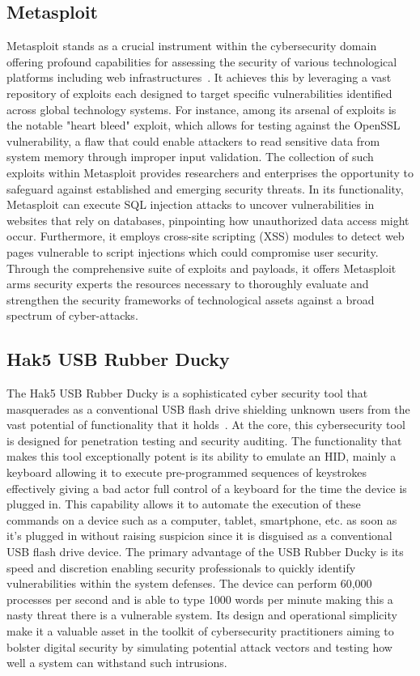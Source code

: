 \documentclass[manuscript,acmsmall,anonymous,review,screen,nonacm=true, authorversion=true]{acmart}
\begin{document}
\subsection{Metasploit}
Metasploit stands as a crucial instrument within the cybersecurity domain offering
profound capabilities for assessing the security of various technological platforms including web
infrastructures~\cite{metasploit,OpenAI}. It achieves this by leveraging a vast repository of exploits each designed to
target specific vulnerabilities identified across global technology systems. For instance,
among its arsenal of exploits is the notable "heart bleed" exploit, which allows for testing against
the OpenSSL vulnerability, a flaw that could enable attackers to read sensitive data from system
memory through improper input validation. The collection of such exploits within
Metasploit provides researchers and enterprises the opportunity to safeguard against established
and emerging security threats. In its functionality, Metasploit can execute SQL injection
attacks to uncover vulnerabilities in websites that rely on databases, pinpointing how
unauthorized data access might occur. Furthermore, it employs cross-site scripting (XSS)
modules to detect web pages vulnerable to script injections which could compromise user
security. Through the comprehensive suite of exploits and payloads, it offers Metasploit
arms security experts the resources necessary to thoroughly evaluate and strengthen the security
frameworks of technological assets against a broad spectrum of cyber-attacks.

\subsection{Hak5 USB Rubber Ducky}
The Hak5 USB Rubber Ducky is a sophisticated cyber security tool that masquerades as a
conventional USB flash drive shielding unknown users from the vast potential of functionality 
that it holds~\cite{hak5rubberducky}. At the core, this cybersecurity tool is designed for penetration testing and
security auditing\cite{hak5rubberducky}. The functionality that makes this tool exceptionally potent is its ability to
emulate an HID, mainly a keyboard allowing it to execute pre-programmed sequences of
keystrokes effectively giving a bad actor full control of a keyboard for the time the device is
plugged in\cite{hak5rubberducky}. This capability allows it to automate the execution of these commands on a device
such as a computer, tablet, smartphone, etc. as soon as it’s plugged in without raising suspicion
since it is disguised as a conventional USB flash drive device\cite{hak5rubberducky}. The primary advantage of the
USB Rubber Ducky is its speed and discretion enabling security professionals to quickly identify
vulnerabilities within the system defenses\cite{hak5rubberducky}. The device can perform 60,000 processes per
second and is able to type 1000 words per minute making this a nasty threat there is a vulnerable
system\cite{hak5rubberducky}. Its design and operational simplicity make it a valuable asset in the toolkit of
cybersecurity practitioners aiming to bolster digital security by simulating potential attack
vectors and testing how well a system can withstand such intrusions\cite{hak5rubberducky}.
\end{document}
